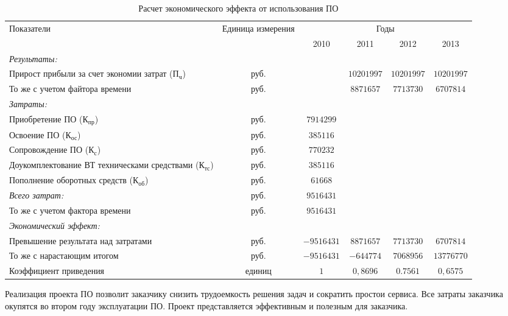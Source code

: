 \noindent
\begin{table}[ht]\footnotesize
  \caption{Расчет экономического эффекта от использования ПО}
  \label{economics-effect}
  \begin{tabularx}{\textwidth}{| X | c | c | c | c | c |}
    \hline
    \multirow{2}{*}{Показатели} & \multirow{2}{*}{Единица измерения} & \multicolumn{4}{c|}{Годы}\\
    \cline{3-6}
    & & 2010 & 2011 & 2012 & 2013\\
    \hline
    \emph{Результаты:} & & & & & \\
    \hline
    Прирост прибыли за счет экономии затрат ($\text{П}_\text{ч}$) & руб. & & $10201997$ & $10201997$ & $10201997$\\
    \hline
    То же с учетом файтора времени & руб. & & $8871657$ & $7713730$ & $6707814$ \\
    \hline
    \emph{Затраты:} & & & & & \\
    \hline
    Приобретение ПО ($\text{К}_\text{пр}$) & руб. & $7914299$ & & & \\
    \hline
    Освоение ПО ($\text{К}_\text{ос}$) & руб. & $385116$ & & & \\
    \hline
    Сопровождение ПО ($\text{К}_\text{с}$) & руб. & $770232$ & & & \\
    \hline
    Доукомплектование ВТ техническами средствами ($\text{К}_\text{тс}$) & руб. & $385116$ & & & \\
    \hline
    Пополнение оборотных средств ($\text{К}_\text{об}$) & руб. & $61668$ & & & \\
    \hline
    \emph{Всего затрат:} & руб. & $9516431$ & & & \\
    \hline
    То же с учетом фактора времени & руб. & $9516431$ & & & \\
    \hline
    \emph{Экономический эффект:} & & & & & \\
    \hline
    Превышение результата над затратами & руб. & $-9516431$ & $8871657$ & $7713730$ & $6707814$ \\
    \hline
    То же с нарастающим итогом & руб. & $-9516431$ & $-644774$ & $7068956$ & $13776770$ \\
    \hline
    Коэффициент приведения & единиц & $1$ & $0,8696$ & $0.7561$ & $0,6575$ \\
    \hline
  \end{tabularx}
\end{table}

Реализация проекта ПО позволит заказчику снизить трудоемкость решения задач и сократить простои сервиса. Все затраты заказчика окупятся во втором году эксплуатации ПО. Проект представляется эффективным и полезным для заказчика.

\newpage
